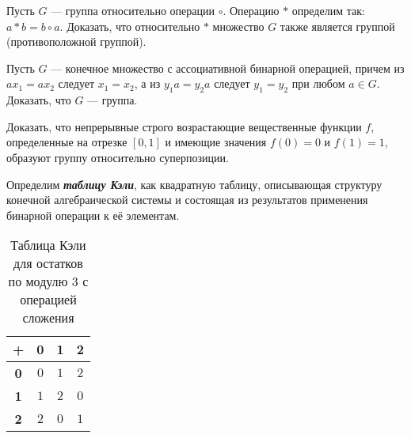 \documentclass{article}
\begin{document}
    \begin{task_boxed}
        Пусть $G$ — группа относительно операции $\circ$.
        Операцию $*$ определим так: $a * b = b \circ a$.
        Доказать, что
        относительно $*$ множество $G$ также является группой (противоположной группой).
    \end{task_boxed}

    \begin{task_boxed}
        Пусть $G$ — конечное множество с ассоциативной бинарной операцией, причем из $ax_1 = ax_2$ следует $x_1 = x_2$,
        а из $y_{1}a = y_{2}a$ следует $y_1 = y_2$ при любом $a \in G$.
        Доказать, что $G$ — группа.
    \end{task_boxed}

    \begin{task_boxed}
        Доказать, что непрерывные строго возрастающие вещественные функции $f$, определенные на отрезке $[0,1]$
        и имеющие значения $f(0) = 0$ и $f(1) = 1$, образуют группу относительно суперпозиции.
    \end{task_boxed}

    \begin{definition_boxed}

        Определим \textbf{\textit{таблицу Кэли}}, как квадратную таблицу, описывающая структуру конечной алгебраической системы и состоящая из результатов применения бинарной операции к её элементам.
    \end{definition_boxed}

    \begin{example}
        \begin{table}[h]
            \label{tab:table-2}
            \centering
            \begin{tabular}{|c|c|c|c|}
                \hline
                \textbf{+} & \textbf{0} & \textbf{1} & \textbf{2} \\\hline
                \textbf{0}   & $0$        & $1$        & $2$        \\\hline
                \textbf{1}   & $1$        & $2$        & $0$        \\\hline
                \textbf{2}   & $2$        & $0$        & $1$        \\\hline
            \end{tabular}
            \caption{Таблица Кэли для остатков по модулю 3 с операцией сложения}
        \end{table}
    \end{example}
\end{document}
